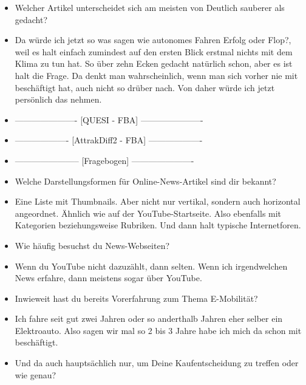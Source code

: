 {\begin{itemize}[]
              Deswegen würde ich da drauf gehen, auch wenn das jetzt eventuell vom Namen her eher das Gegenteil ist.
              Aber meiner Meinung nach hängt das natürlich trotzdem zusammen und würde mir halt sowohl auf positive als auch negative Art und Weise Informationen geben zu dem Thema.
              Der Artikel \flqq Von wegen nur das Klima retten\frqq{}.
        \item {} Welcher Artikel unterscheidet sich am meisten von \flqq Deutlich sauberer als gedacht\frqq{}?
        \item {} Da würde ich jetzt so was sagen wie \flqq autonomes Fahren Erfolg oder Flop?\frqq{}, weil es halt einfach zumindest auf den ersten Blick erstmal nichts mit dem Klima zu tun hat.
              So über zehn Ecken gedacht natürlich schon, aber es ist halt die Frage.
              Da denkt man wahrscheinlich, wenn man sich vorher nie mit beschäftigt hat, auch nicht so drüber nach.
              Von daher würde ich jetzt persönlich das nehmen.
        \item {----------------------} [QUESI - FBA] {----------------------}
        \item {-------------------} [AttrakDiff2 - FBA] {-------------------}
        \item {-----------------------} [Fragebogen] {----------------------}
        \item {} Welche Darstellungsformen für Online-News-Artikel sind dir bekannt?
        \item {} Eine Liste mit Thumbnails.
              Aber nicht nur vertikal, sondern auch horizontal angeordnet.
              Ähnlich wie auf der YouTube-Startseite.
              Also ebenfalls mit Kategorien beziehungsweise Rubriken.
              Und dann halt typische Internetforen.
        \item {} Wie häufig besuchst du News-Webseiten?
        \item {} Wenn du YouTube nicht dazuzählt, dann selten.
              Wenn ich irgendwelchen News erfahre, dann meistens sogar über YouTube.
        \item {} Inwieweit hast du bereits Vorerfahrung zum Thema E-Mobilität?
        \item {} Ich fahre seit gut zwei Jahren oder so anderthalb Jahren eher selber ein Elektroauto.
              Also sagen wir mal so 2 bis 3 Jahre habe ich mich da schon mit beschäftigt.
        \item {} Und da auch hauptsächlich nur, um Deine Kaufentscheidung zu treffen oder wie genau?

\end{itemize}}
